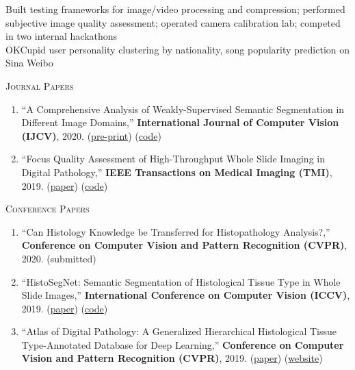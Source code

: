 \documentclass[12pt]{cv_style}
\begin{document}
\medspace
Built testing frameworks for image/video processing and compression; performed subjective image quality assessment; operated camera calibration lab; competed in two internal hackathons\\
\medspace
%
\medspace
OKCupid user personality clustering by nationality, song popularity prediction on Sina Weibo\\
\medspace

\textsc{Journal Papers}
\begin{enumerate}
	\item ``A Comprehensive Analysis of Weakly-Supervised Semantic Segmentation in Different Image Domains,'' \textbf{International Journal of Computer Vision (IJCV)}, 2020. (\href{https://arxiv.org/pdf/1912.11186.pdf}{pre-print}) (\href{https://github.com/lyndonchan/wsss-analysis}{code})
	\item ``Focus Quality Assessment of High-Throughput Whole Slide Imaging in Digital Pathology,'' \textbf{IEEE Transactions on Medical Imaging (TMI)}, 2019. (\href{https://ieeexplore.ieee.org/abstract/document/8725582}{paper}) (\href{https://github.com/mahdihosseini/FQPath}{code})
\end{enumerate}

\textsc{Conference Papers}
\begin{enumerate}
	\item ``Can Histology Knowledge be Transferred for Histopathology Analysis?,'' \textbf{Conference on Computer Vision and Pattern Recognition (CVPR)}, 2020. (submitted)
	\item ``HistoSegNet: Semantic Segmentation of Histological Tissue Type in Whole Slide Images,'' \textbf{International Conference on Computer Vision (ICCV)}, 2019. (\href{http://openaccess.thecvf.com/content_ICCV_2019/papers/Chan_HistoSegNet_Semantic_Segmentation_of_Histological_Tissue_Type_in_Whole_Slide_ICCV_2019_paper.pdf}{paper}) (\href{https://github.com/lyndonchan/hsn_v1}{code})
	\item ``Atlas of Digital Pathology: A Generalized Hierarchical Histological Tissue Type-Annotated Database for Deep Learning,'' \textbf{ Conference on Computer Vision and Pattern Recognition (CVPR)}, 2019. (\href{http://openaccess.thecvf.com/content_CVPR_2019/html/Hosseini_Atlas_of_Digital_Pathology_A_Generalized_Hierarchical_Histological_Tissue_Type-Annotated_CVPR_2019_paper.html}{paper}) (\href{http://www.dsp.utoronto.ca/projects/ADP/}{website})
\end{enumerate}
\end{document}
